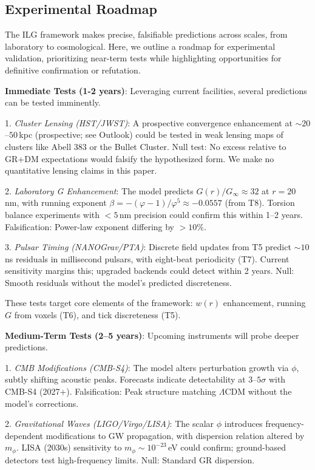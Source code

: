 \documentclass[fleqn,usenatbib]{mnras}
\begin{document}
\subsection{Experimental Roadmap}

The ILG framework makes precise, falsifiable predictions across scales, from laboratory to cosmological. Here, we outline a roadmap for experimental validation, prioritizing near-term tests while highlighting opportunities for definitive confirmation or refutation.

\textbf{Immediate Tests (1-2 years)}: Leveraging current facilities, several predictions can be tested imminently.

1. \emph{Cluster Lensing (HST/JWST)}: A prospective convergence enhancement at $\sim 20$--$50$\,kpc (prospective; see Outlook) could be tested in weak lensing maps of clusters like Abell 383 or the Bullet Cluster. Null test: No excess relative to GR+DM expectations would falsify the hypothesized form. We make no quantitative lensing claims in this paper.

2. \emph{Laboratory G Enhancement}: The model predicts $G(r)/G_\infty \approx 32$ at $r=20$\,nm, with running exponent $\beta = -(\varphi-1)/\varphi^5 \approx -0.0557$ (from T8). Torsion balance experiments with $<5$\,nm precision could confirm this within 1--2 years. Falsification: Power-law exponent differing by $>10\%$.

3. \emph{Pulsar Timing (NANOGrav/PTA)}: Discrete field updates from T5 predict $\sim 10$\,ns residuals in millisecond pulsars, with eight-beat periodicity (T7). Current sensitivity margins this; upgraded backends could detect within 2 years. Null: Smooth residuals without the model's predicted discreteness.

These tests target core elements of the framework: $w(r)$ enhancement, running $G$ from voxels (T6), and tick discreteness (T5).

\textbf{Medium-Term Tests (2--5 years)}: Upcoming instruments will probe deeper predictions.

1. \emph{CMB Modifications (CMB-S4)}: The model alters perturbation growth via $\phi$, subtly shifting acoustic peaks. Forecasts indicate detectability at $3$--$5\sigma$ with CMB-S4 (2027+). Falsification: Peak structure matching $\Lambda$CDM without the model's corrections.

2. \emph{Gravitational Waves (LIGO/Virgo/LISA)}: The scalar $\phi$ introduces frequency-dependent modifications to GW propagation, with dispersion relation altered by $m_\phi$. LISA (2030s) sensitivity to $m_\phi \sim 10^{-23}$\,eV could confirm; ground-based detectors test high-frequency limits. Null: Standard GR dispersion.
\end{document}
